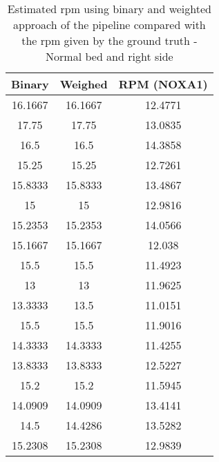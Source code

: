 
\begin{table}[H]
    \centering
    \begin{tabular}{|c|c|c|}
    \hline 
    Binary & Weighed  & RPM (NOXA1) \\ 
    
    \hline 
     16.1667   & 16.1667 & 12.4771 \\ 
     17.75  & 17.75 & 13.0835 \\ 
      16.5   & 16.5 & 14.3858 \\  
     15.25   & 15.25 & 12.7261 \\ 
  15.8333   & 15.8333 & 13.4867 \\ 
     15   & 15 & 12.9816 \\ 
     15.2353 &   15.2353 & 14.0566 \\ 
      15.1667  & 15.1667 & 12.038 \\ 
     15.5  & 15.5 & 11.4923 \\ 
     13  & 13 & 11.9625 \\ 
     13.3333   & 13.5 & 11.0151 \\ 
      15.5   & 15.5 & 11.9016 \\ 
     14.3333  & 14.3333 & 11.4255 \\ 
   13.8333  & 13.8333 & 12.5227 \\  
     15.2   & 15.2 & 11.5945 \\ 
      14.0909   & 14.0909 & 13.4141 \\  
     14.5   & 14.4286 & 13.5282 \\ 
      15.2308   & 15.2308 & 12.9839 \\ 
    \hline 
    \end{tabular}
    \caption{Estimated rpm using binary and weighted approach of the pipeline
    compared with the rpm given by the ground truth - Normal bed and right side}
    \label{tab:RightNormalStill}
    \end{table}
